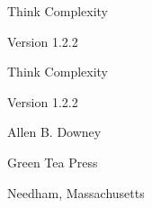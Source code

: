 \documentclass[10pt]{book}
\newcommand{\thetitle}{Think Complexity}
\newcommand{\theversion}{1.2.2}
\begin{document}
\begin{latexonly}

\renewcommand{\blankpage}{\thispagestyle{empty} \quad \newpage}



\thispagestyle{empty}

\begin{flushright}
\vspace*{2.0in}

\begin{spacing}{3}
{\huge \thetitle}
\end{spacing}

\vspace{0.25in}

Version \theversion

\vfill

\end{flushright}


\blankpage
\blankpage

\pagebreak
\thispagestyle{empty}

\begin{flushright}
\vspace*{2.0in}

\begin{spacing}{3}
{\huge \thetitle}
\end{spacing}

\vspace{0.25in}

Version \theversion

\vspace{1in}


{\Large
Allen B. Downey\\
}


\vspace{0.5in}

{\Large Green Tea Press}

{\small Needham, Massachusetts}

\vfill

\end{flushright}



\end{latexonly}
\end{document}
